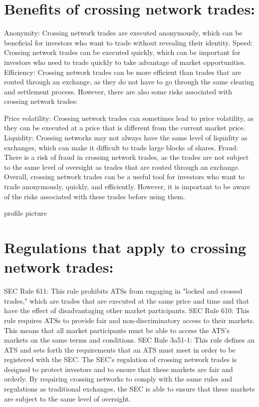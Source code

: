 \documentclass[11pt]{article}
\begin{document}
\section{Benefits of crossing network trades:}
\label{sec:orgd81af1b}

Anonymity: Crossing network trades are executed anonymously, which can be beneficial for investors who want to trade without revealing their identity.
Speed: Crossing network trades can be executed quickly, which can be important for investors who need to trade quickly to take advantage of market opportunities.
Efficiency: Crossing network trades can be more efficient than trades that are routed through an exchange, as they do not have to go through the same clearing and settlement process.
However, there are also some risks associated with crossing network trades:

Price volatility: Crossing network trades can sometimes lead to price volatility, as they can be executed at a price that is different from the current market price.
Liquidity: Crossing networks may not always have the same level of liquidity as exchanges, which can make it difficult to trade large blocks of shares.
Fraud: There is a risk of fraud in crossing network trades, as the trades are not subject to the same level of oversight as trades that are routed through an exchange.
Overall, crossing network trades can be a useful tool for investors who want to trade anonymously, quickly, and efficiently. However, it is important to be aware of the risks associated with these trades before using them.

profile picture

\section{Regulations that apply to crossing network trades:}
\label{sec:org6a07c3f}

SEC Rule 611: This rule prohibits ATSs from engaging in "locked and crossed trades," which are trades that are executed at the same price and time and that have the effect of disadvantaging other market participants.
SEC Rule 610: This rule requires ATSs to provide fair and non-discriminatory access to their markets. This means that all market participants must be able to access the ATS's markets on the same terms and conditions.
SEC Rule 3a51-1: This rule defines an ATS and sets forth the requirements that an ATS must meet in order to be registered with the SEC.
The SEC's regulation of crossing network trades is designed to protect investors and to ensure that these markets are fair and orderly. By requiring crossing networks to comply with the same rules and regulations as traditional exchanges, the SEC is able to ensure that these markets are subject to the same level of oversight.
\end{document}
